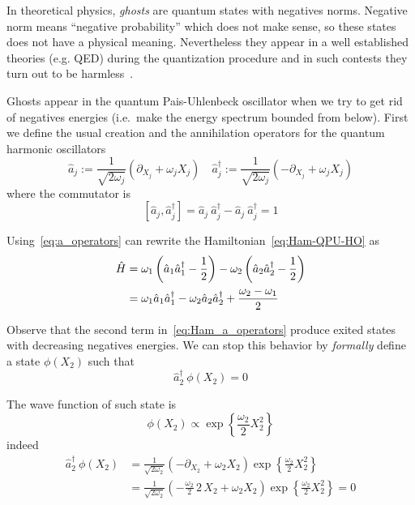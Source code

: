 In theoretical physics, \emph{ghosts} are quantum states with negatives norms.
Negative norm means ``negative probability'' which does not make sense, so
these states does not have a physical meaning. Nevertheless they appear in a
well established theories (e.g. QED) during the quantization procedure and in
such contests they turn out to be harmless~\cite{Smilga01}.

Ghosts appear in the quantum Pais-Uhlenbeck oscillator when we try to get rid
of negatives energies (i.e.\ make the energy spectrum bounded from below).
First we define the usual creation and the annihilation operators for the
quantum harmonic oscillators
\begin{equation} \label{eq:a_operators}
  \hat{a}_j := \frac{1}{\sqrt{2\omega_j}}
    \left(\partial_{X_j} + \omega_j X_j\right) \quad
  \hat{a}_j^{\dagger} := \frac{1}{\sqrt{2\omega_j}}
    \left(-\partial_{X_j} + \omega_j X_j\right)
\end{equation}
where the commutator is
\begin{equation} \label{eq:a_commutator}
  \left[ \hat{a}_j, \hat{a}_j^{\dagger} \right] =
  \hat{a}_j \ \hat{a}_j^{\dagger} - \hat{a}_j \ \hat{a}_j^{\dagger} = 1
\end{equation}

Using~\eqref{eq:a_operators} can rewrite the Hamiltonian~\eqref{eq:Ham-QPU-HO} as
\begin{align} \label{eq:Ham_a_operators}
  \hat{H} &=
    \omega_1 \left( \hat{a}_1 \hat{a}_1^{\dagger} - \frac{1}{2} \right) -
    \omega_2 \left( \hat{a}_2 \hat{a}_2^{\dagger} - \frac{1}{2} \right) \notag
    \\    &=
    \omega_1 \hat{a}_1 \hat{a}_1^{\dagger} -
    \omega_2 \hat{a}_2 \hat{a}_2^{\dagger} +
    \frac{\omega_2 - \omega_1}{2}
\end{align}

Observe that the second term in~\eqref{eq:Ham_a_operators} produce exited states
with decreasing negatives energies. We can stop this behavior by \emph{formally}
define a state $\phi(X_2)$ such that
\begin{equation*}
  \hat{a}_2^{\dagger} \ \phi(X_2) = 0
\end{equation*}

The wave function of such state is~\cite{Ilhan13}
\begin{equation*}
  \phi(X_2) \propto \exp \left\{ \frac{\omega_2}{2} X_2^2\right\}
\end{equation*}
indeed
\begin{align*}
  \hat{a}_2^{\dagger} \ \phi(X_2)
  &= \frac{1}{\sqrt{2\omega_2}}
    \left(-\partial_{X_2} + \omega_2 X_2\right)
    \exp \left\{ \frac{\omega_2}{2} X_2^2\right\} \\
  &= \frac{1}{\sqrt{2\omega_2}}
    \left(-\frac{\omega_2}{2} \, 2 \, X_2 + \omega_2 X_2\right)
    \exp \left\{ \frac{\omega_2}{2} X_2^2\right\}
  = 0
\end{align*}

